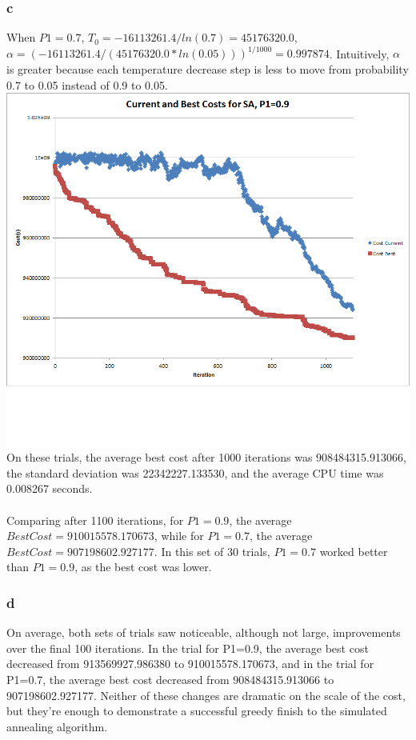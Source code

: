 \documentclass[12pt]{article}
\begin{document}
\subsubsection{c}
When $P1 = 0.7$, $T_0 = -16113261.4/ln(0.7) = 45176320.0$, $\alpha = (-16113261.4/(45176320.0 * ln(0.05)))^{1/1000} = 0.997874$. Intuitively, $\alpha$ is greater because each temperature decrease step is less to move from probability 0.7 to 0.05 instead of 0.9 to 0.05.\\
\includegraphics[width=\linewidth]{p1_09.png}
On these trials, the average best cost after 1000 iterations was 908484315.913066, the standard deviation was 22342227.133530, and the average CPU time was 0.008267 seconds.\\\\
Comparing after 1100 iterations, for $P1=0.9$, the average $BestCost=910015578.170673$, while for $P1=0.7$, the average $BestCost=907198602.927177$. In this set of 30 trials, $P1=0.7$ worked better than $P1=0.9$, as the best cost was lower.

\subsubsection{d}
On average, both sets of trials saw noticeable, although not large, improvements over the final 100 iterations. In the trial for P1=0.9, the average best cost decreased from 913569927.986380 to 910015578.170673, and in the trial for P1=0.7, the average best cost decreased from 908484315.913066 to 907198602.927177. Neither of these changes are dramatic on the scale of the cost, but they're enough to demonstrate a successful greedy finish to the simulated annealing algorithm.
\end{document}

